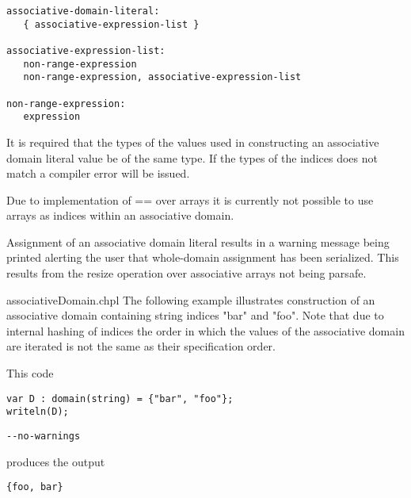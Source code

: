 \begin{syntax}
\begin{verbatim}
associative-domain-literal:
   { associative-expression-list }

associative-expression-list:
   non-range-expression
   non-range-expression, associative-expression-list

non-range-expression:
   expression
\end{verbatim}
\end{syntax}

It is required that the types of the values used in constructing an associative
domain literal value be of the same type.  If the types of the indices does not
match a compiler error will be issued.

\begin{future}
Due to implementation of == over arrays it is currently not possible to use
arrays as indices within an associative domain. 
\end{future}

\begin{openissue}
Assignment of an associative domain literal results in a warning message
being printed alerting the user that whole-domain assignment has been
serialized. This results from the resize operation over associative arrays not
being parsafe. 
\end{openissue}

\begin{chapelexample}{associativeDomain.chpl}
The following example illustrates construction of an associative domain
containing string indices "bar" and "foo".  Note that due to internal hashing 
of indices the order in which the values of the associative domain are iterated
is not the same as their specification order.

This code
\begin{chapel}
\begin{verbatim}
var D : domain(string) = {"bar", "foo"};
writeln(D);
\end{verbatim}
\end{chapel}
\begin{chapelcompopts}
\begin{verbatim}
--no-warnings
\end{verbatim}
\end{chapelcompopts}
produces the output
\begin{chapelprintoutput}
\begin{verbatim}
{foo, bar}
\end{verbatim}
\end{chapelprintoutput}
\end{chapelexample}

